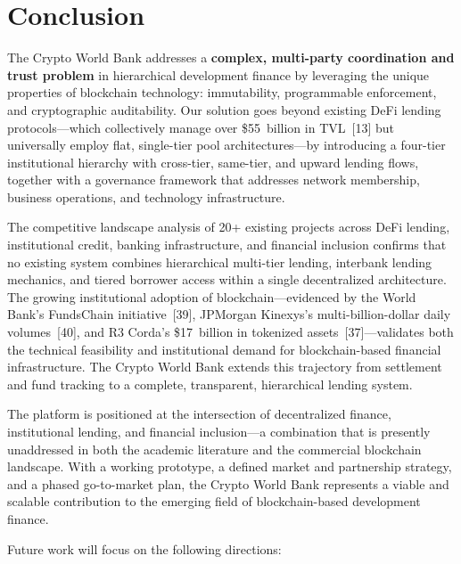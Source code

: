 \documentclass[12pt,a4paper]{report}
\begin{document}
\chapter{Conclusion}

The Crypto World Bank addresses a \textbf{complex, multi-party coordination and trust problem} in hierarchical development finance by leveraging the unique properties of blockchain technology: immutability, programmable enforcement, and cryptographic auditability. Our solution goes beyond existing DeFi lending protocols---which collectively manage over \$55~billion in TVL~[13] but universally employ flat, single-tier pool architectures---by introducing a four-tier institutional hierarchy with cross-tier, same-tier, and upward lending flows, together with a governance framework that addresses network membership, business operations, and technology infrastructure.

The competitive landscape analysis of 20+ existing projects across DeFi lending, institutional credit, banking infrastructure, and financial inclusion confirms that no existing system combines hierarchical multi-tier lending, interbank lending mechanics, and tiered borrower access within a single decentralized architecture. The growing institutional adoption of blockchain---evidenced by the World Bank's FundsChain initiative~[39], JPMorgan Kinexys's multi-billion-dollar daily volumes~[40], and R3 Corda's \$17~billion in tokenized assets~[37]---validates both the technical feasibility and institutional demand for blockchain-based financial infrastructure. The Crypto World Bank extends this trajectory from settlement and fund tracking to a complete, transparent, hierarchical lending system.

The platform is positioned at the intersection of decentralized finance, institutional lending, and financial inclusion---a combination that is presently unaddressed in both the academic literature and the commercial blockchain landscape. With a working prototype, a defined market and partnership strategy, and a phased go-to-market plan, the Crypto World Bank represents a viable and scalable contribution to the emerging field of blockchain-based development finance.

Future work will focus on the following directions:
\end{document}
